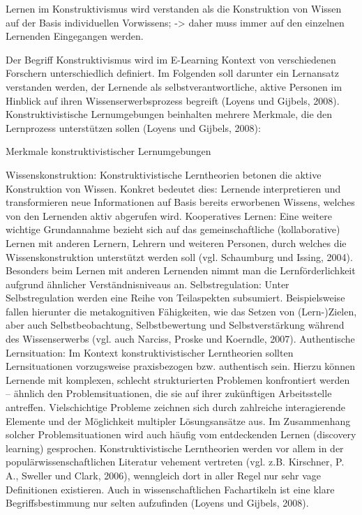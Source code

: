 \documentclass[a4paper, 12pt, twoside, BCOR=20mm, DIV=calc, abstracton, parskip=half*, toc=bibliography, toc=listof, headsepline, footsepline, headings=small, numbers=enddot]{scrreprt}
\begin{document}
	Lernen im Konstruktivismus wird verstanden als die Konstruktion von Wissen auf der Basis individuellen Vorwissens; -> daher muss immer auf den einzelnen Lernenden Eingegangen werden. \cite[S.30ff]{issing2009online}
	
	Der Begriff Konstruktivismus wird im E-Learning Kontext von verschiedenen Forschern unterschiedlich definiert. Im Folgenden soll darunter ein Lernansatz verstanden werden, der Lernende als selbstverantwortliche, aktive Personen im Hinblick auf ihren Wissenserwerbsprozess begreift (Loyens und Gijbels, 2008). Konstruktivistische Lernumgebungen beinhalten mehrere Merkmale, die den Lernprozess unterstützen sollen (Loyens und Gijbels, 2008):
	
	Merkmale konstruktivistischer Lernumgebungen
	
	Wissenskonstruktion: Konstruktivistische Lerntheorien betonen die aktive Konstruktion von Wissen. Konkret bedeutet dies: Lernende interpretieren und transformieren neue Informationen auf Basis bereits erworbenen Wissens, welches von den Lernenden aktiv abgerufen wird.
	Kooperatives Lernen: Eine weitere wichtige Grundannahme bezieht sich auf das gemeinschaftliche (kollaborative) Lernen mit anderen Lernern, Lehrern und weiteren Personen, durch welches die Wissenskonstruktion unterstützt werden soll (vgl. Schaumburg und Issing, 2004). Besonders beim Lernen mit anderen Lernenden nimmt man die Lernförderlichkeit aufgrund ähnlicher Verständnisniveaus an.
	Selbstregulation: Unter Selbstregulation werden eine Reihe von Teilaspekten subsumiert. Beispielsweise fallen hierunter die metakognitiven Fähigkeiten, wie das Setzen von (Lern-)Zielen, aber auch Selbstbeobachtung, Selbstbewertung und Selbstverstärkung während des Wissenserwerbs (vgl. auch Narciss, Proske und Koerndle, 2007).
	Authentische Lernsituation: Im Kontext konstruktivistischer Lerntheorien sollten Lernsituationen vorzugsweise praxisbezogen bzw. authentisch sein. Hierzu können Lernende mit komplexen, schlecht strukturierten Problemen konfrontiert werden – ähnlich den Problemsituationen, die sie auf ihrer zukünftigen Arbeitsstelle antreffen. Vielschichtige Probleme zeichnen sich durch zahlreiche interagierende Elemente und der Möglichkeit multipler Lösungsansätze aus. Im Zusammenhang solcher Problemsituationen wird auch häufig vom entdeckenden Lernen (discovery learning) gesprochen.
	Konstruktivistische Lerntheorien werden vor allem in der populärwissenschaftlichen Literatur vehement vertreten (vgl. z.B. Kirschner, P. A., Sweller und Clark, 2006), wenngleich dort in aller Regel nur sehr vage Definitionen existieren. Auch in wissenschaftlichen Fachartikeln ist eine klare Begriffsbestimmung nur selten aufzufinden (Loyens und Gijbels, 2008).
	
\end{document}
